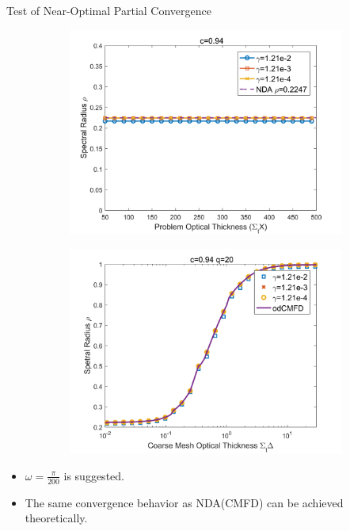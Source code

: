 \begin{frame}{Test of Near-Optimal Partial Convergence}
\vspace{-1em}
 \begin{figure}
	\centering
	\captionsetup[subfigure]{justification=centering}
	\begin{subfigure}[t]{0.45\textwidth}
		\centering
 		\includegraphics[width=\textwidth]{Texfile/Figure/NDAoptimal.png}
	\end{subfigure}
	\begin{subfigure}[t]{0.45\textwidth}
		\centering
		\includegraphics[width=\textwidth]{Texfile/Figure/CMFDoptimal.png}
	\end{subfigure}
\end{figure} 
\vspace{-1.5em}
\begin{itemize}
    \item $\omega=\frac{\pi}{200}$ is suggested.
    \item The same convergence behavior as NDA(CMFD) can be achieved theoretically.
\end{itemize}
\end{frame}
